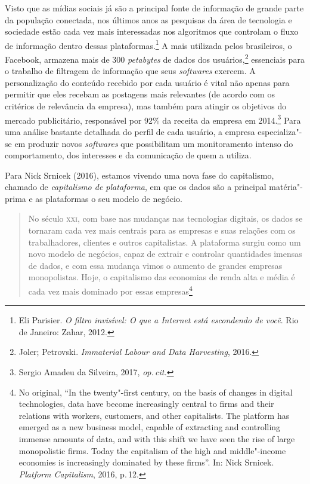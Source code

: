Visto que as mídias sociais já são a principal fonte de informação de
grande parte da população conectada, nos últimos anos as pesquisas da
área de tecnologia e sociedade estão cada vez mais interessadas nos
algoritmos que controlam o fluxo de informação dentro dessas plataformas.\footnote{Eli Parisier. \emph{O filtro invisível: O que a Internet está escondendo
de você}. Rio de Janeiro: Zahar, 2012.}
A mais utilizada pelos brasileiros, o Facebook,
armazena mais de 300 \emph{petabytes} de dados dos usuários,\footnote{Joler; Petrovski. \emph{Immaterial Labour and Data Harvesting}, 2016.}
essenciais para o trabalho de filtragem de informação que seus \emph{softwares} exercem. A personalização do conteúdo recebido por cada usuário é vital
não apenas para permitir que eles recebam as postagens mais relevantes
(de acordo com os critérios de relevância da empresa), mas também para
atingir os objetivos do mercado publicitário, responsável por 92\% da
receita da empresa em 2014.\footnote{Sergio Amadeu da Silveira, 2017, \textit{op.\,cit.}} Para uma análise bastante
detalhada do perfil de cada usuário, a empresa especializa"-se em
produzir novos \emph{softwares} que possibilitam um monitoramento intenso do
comportamento, dos interesses e da comunicação de quem a utiliza.

Para Nick Srnicek (2016), estamos vivendo uma nova fase do capitalismo,
chamado de \textit{capitalismo de plataforma}, em que os dados são a
principal matéria"-prima e as plataformas o seu modelo de negócio.

\begin{quote}
No século \textsc{xxi}, com base nas mudanças nas tecnologias digitais, os dados
se tornaram cada vez mais centrais para as empresas e suas relações com
os trabalhadores, clientes e outros capitalistas. A plataforma surgiu
como um novo modelo de negócios, capaz de extrair e controlar
quantidades imensas de dados, e com essa mudança vimos o aumento de
grandes empresas monopolistas. Hoje, o capitalismo das economias de
renda alta e média é cada vez mais dominado por essas empresas\footnote{No original, ``In
  the twenty"-first century, on the basis of changes in digital
  technologies, data have become increasingly central to firms and their
  relations with workers, customers, and other capitalists. The platform
  has emerged as a new business model, capable of extracting and
  controlling immense amounts of data, and with this shift we have seen
  the rise of large monopolistic firms. Today the capitalism of the high
  and middle"-income economies is increasingly dominated by these
  firms''. In: Nick Srnicek. \emph{Platform Capitalism}, 2016, p.\,12.}
\end{quote}

